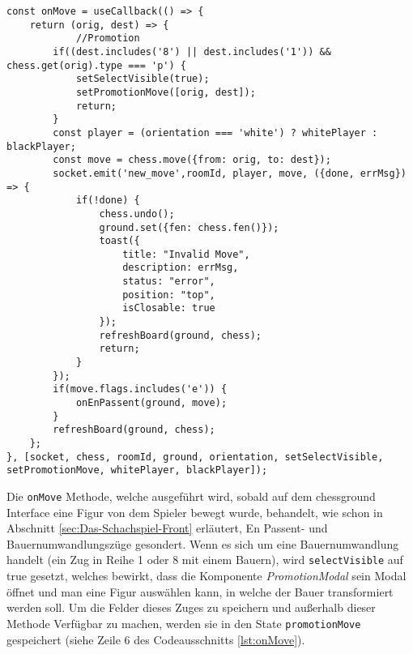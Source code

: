\begin{lstlisting}[style=codeStyle, caption={Die onMove Methode}, label={lst:onMove}]
const onMove = useCallback(() => {
    return (orig, dest) => {
    		//Promotion
        if((dest.includes('8') || dest.includes('1')) && chess.get(orig).type === 'p') { 
            setSelectVisible(true);
            setPromotionMove([orig, dest]);
            return;
        }
        const player = (orientation === 'white') ? whitePlayer : blackPlayer;
        const move = chess.move({from: orig, to: dest});
        socket.emit('new_move',roomId, player, move, ({done, errMsg}) => {
            if(!done) {
                chess.undo();
                ground.set({fen: chess.fen()});
                toast({
                    title: "Invalid Move",
                    description: errMsg,
                    status: "error",
                    position: "top",
                    isClosable: true
                });
                refreshBoard(ground, chess);
                return;
            }
        });
        if(move.flags.includes('e')) {
            onEnPassent(ground, move);
        }
        refreshBoard(ground, chess);
    };
}, [socket, chess, roomId, ground, orientation, setSelectVisible, setPromotionMove, whitePlayer, blackPlayer]);
\end{lstlisting}

Die \verb|onMove| Methode, welche ausgeführt wird, sobald auf dem chessground Interface eine Figur von dem Spieler bewegt wurde, behandelt, wie schon in Abschnitt \ref{sec:Das-Schachspiel-Front} erläutert, En Passent- und Bauernumwandlungszüge gesondert. Wenn es sich um eine Bauernumwandlung handelt (ein Zug in Reihe 1 oder 8 mit einem Bauern), wird \verb|selectVisible| auf true gesetzt, welches bewirkt, dass die Komponente \textit{PromotionModal} sein Modal öffnet und man eine Figur auswählen kann, in welche der Bauer transformiert werden soll. Um die Felder dieses Zuges zu speichern und außerhalb dieser Methode Verfügbar zu machen, werden sie in den State \verb|promotionMove| gespeichert (siehe Zeile 6 des Codeausschnitts \ref{lst:onMove}).

